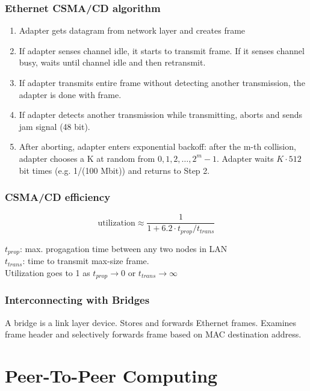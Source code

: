 \documentclass[10pt, a4paper, twocolumn]{scrartcl}
\begin{document}
\subsubsection{Ethernet CSMA/CD algorithm}

\begin{enumerate}
	\item Adapter gets datagram from network layer and creates frame
	\item If adapter senses channel idle, it starts to transmit frame. If it senses channel busy, waits until channel idle and then retransmit.
	\item If adapter transmits entire frame without detecting another transmission, the adapter is done with frame.
	\item If adapter detects another transmission while transmitting, aborts and sends jam signal (48 bit).
	\item After aborting, adapter enters exponential backoff: after the m-th collision, adapter chooses a K at random from ${0,1,2,\ldots,2^m-1}$. Adapter waits $K\cdotp512$ bit times (e.g. 1/(100 Mbit)) and returns to Step 2.
\end{enumerate}

\subsubsection{CSMA/CD efficiency}

\begin{displaymath}
	\mbox{utilization} \approx \frac{1}{1 + 6.2\cdotp t_{prop}/t_{trans}}
\end{displaymath}

$t_{prop}$: max. progagation time between any two nodes in LAN\\
$t_{trans}$: time to transmit max-size frame.\\
Utilization goes to 1 as $t_{prop}\to 0$ or $t_{trans}\to \infty$


\subsubsection{Interconnecting with Bridges}

A bridge is a link layer device. Stores and forwards Ethernet frames. Examines frame header and selectively forwards frame based on MAC destination address.

\section{Peer-To-Peer Computing}
\end{document}
